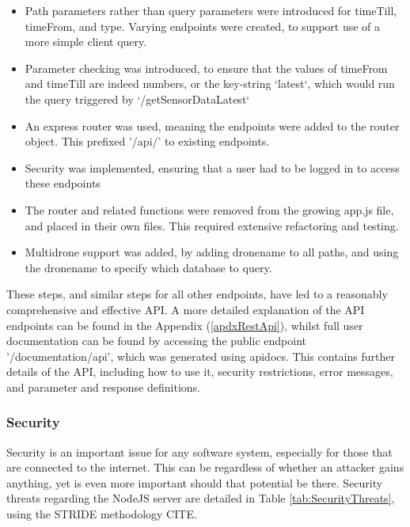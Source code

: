 \documentclass{article}
\begin{document}
\begin{itemize}
	\item Path parameters rather than query parameters were introduced for timeTill, timeFrom, and type. Varying endpoints were created, to support use of a more simple client query. 
	\item Parameter checking was introduced, to ensure that the values of timeFrom and timeTill are indeed numbers, or the key-string `latest`, which would run the query triggered by `/getSensorDataLatest`
	\item An express router was used, meaning the endpoints were added to the router object. This prefixed '/api/' to existing endpoints. 
	\item Security was implemented, ensuring that a user had to be logged in to access these endpoints
	\item The router and related functions were removed from the growing app.js file, and placed in their own files. This required extensive refactoring and testing.
	\item Multidrone support was added, by adding dronename to all paths, and using the dronename to specify which database to query.
\end{itemize}

These steps, and similar steps for all other endpoints, have led to a reasonably comprehensive and effective API. A more detailed explanation of the API endpoints can be found in the Appendix (\ref{apdxRestApi}), whilst full user documentation can be found by accessing the public endpoint '/documentation/api', which was generated using apidocs\cite{apidocs}. This contains further details of the API, including how to use it, security restrictions, error messages, and parameter and response definitions.

\subsubsection{Security}
Security is an important issue for any software system, especially for those that are connected to the internet. This can be regardless of whether an attacker gains anything, yet is even more important should that potential be there. Security threats regarding the NodeJS server are detailed in Table \ref{tab:SecurityThreats}, using the STRIDE methodology CITE.
\end{document}
